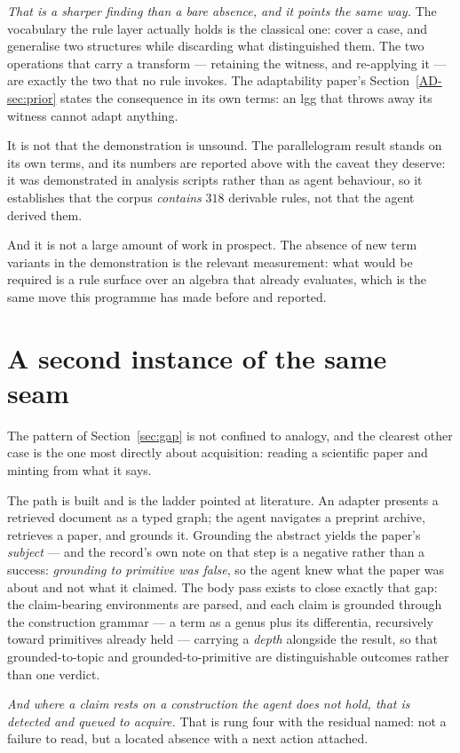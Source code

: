 \documentclass[11pt,a4paper]{article}
\theoremstyle{remark}
\begin{document}
\emph{That is a sharper finding than a bare absence, and it points the same way.} The vocabulary the
rule layer actually holds is the classical one: cover a case, and generalise two structures while
discarding what distinguished them. The two operations that carry a transform --- retaining the witness,
and re-applying it --- are exactly the two that no rule invokes. The adaptability paper's
Section~\ref{AD-sec:prior} states the consequence in its own terms: an lgg that throws away its witness
cannot adapt anything.

It is not that the demonstration is unsound. The parallelogram result stands on its own terms, and its
numbers are reported above with the caveat they deserve: it was demonstrated in analysis scripts rather
than as agent behaviour, so it establishes that the corpus \emph{contains} $318$ derivable rules, not
that the agent derived them.

And it is not a large amount of work in prospect. The absence of new term variants in the demonstration
is the relevant measurement: what would be required is a rule surface over an algebra that already
evaluates, which is the same move this programme has made before and reported.

\section{A second instance of the same seam}\label{sec:reading}
The pattern of Section~\ref{sec:gap} is not confined to analogy, and the clearest other case is the one
most directly about acquisition: reading a scientific paper and minting from what it says.

The path is built and is the ladder pointed at literature. An adapter presents a retrieved document
as a typed graph; the agent navigates a preprint archive, retrieves a paper, and grounds it. Grounding
the abstract yields the paper's \emph{subject} --- and the record's own note on that step is a negative
rather than a success: \emph{grounding to primitive was false}, so the agent knew what the paper was
about and not what it claimed. The body pass exists to close exactly that gap: the claim-bearing
environments are parsed, and each claim is grounded through the construction grammar --- a term as a
genus plus its differentia, recursively toward primitives already held --- carrying a \emph{depth}
alongside the result, so that grounded-to-topic and grounded-to-primitive are distinguishable outcomes
rather than one verdict.

\emph{And where a claim rests on a construction the agent does not hold, that is detected and queued to
acquire.} That is rung four with the residual named: not a failure to read, but a located absence with
a next action attached.
\end{document}
